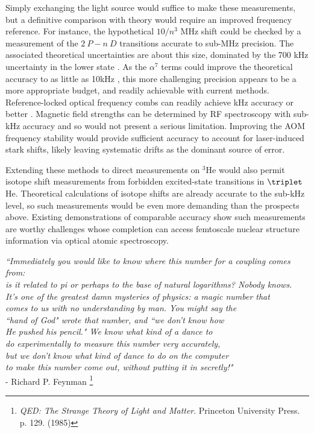 Simply exchanging the light source would suffice to make these measurements, but a definitive comparison with theory would require an improved frequency reference. For instance, the hypothetical $10/n^3$ MHz shift could be checked by a measurement of the $2~P-n~D$ transitions accurate to sub-MHz precision. The associated theoretical uncertainties are about this size, dominated by the 700 kHz uncertainty in the lower state \cite{Pachucki17,Wienczek19}. As the $\alpha^7$ terms could improve the theoretical accuracy to as little as 10kHz \cite{Pachucki17}, this more challenging precision appears to be a more appropriate budget, and readily achievable with current methods. Reference-locked optical frequency combs can readily achieve kHz accuracy or better \cite{Luo15,Rengelink18}. Magnetic field strengths can be determined by RF spectroscopy with sub-kHz accuracy and so would not present a serious limitation. Improving the AOM frequency stability would provide sufficient accuracy to account for laser-induced stark shifts, likely leaving systematic drifts as the dominant source of error.

Extending these methods to direct measurements on $^3$He would also permit isotope shift measurements from forbidden excited-state transitions in $\triplet$He. Theoretical calculations of isotope shifts are already accurate to the sub-kHz level, so such measurements would be even more demanding than the prospects above. Existing demonstrations of comparable accuracy \cite{Rengelink18} show such measurements are worthy challenges whose completion can access femtoscale nuclear structure information via optical atomic spectroscopy.


\vfill

\begin{flushright}
\emph{
``Immediately you would like to know where this number for a coupling comes from:\\ 
is it related to pi or perhaps to the base of natural logarithms? Nobody knows.\\
It's one of the greatest damn mysteries of physics: a magic number that\\
comes to us with no understanding by man. You might say the \\
``hand of God" wrote that number, and ``we don't know how\\
He pushed his pencil." We know what kind of a dance to\\
 do experimentally to measure this number very accurately,\\
  but we don't know what kind of dance to do on the computer\\
to make this number come out, without putting it in secretly!"}\\
- Richard P. Feynman \footnote{\emph{QED: The Strange Theory of Light and Matter}. Princeton University Press. p. 129. (1985)}
\end{flushright}



